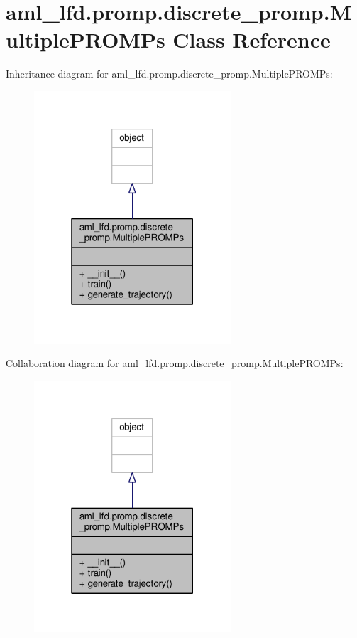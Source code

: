 \hypertarget{classaml__lfd_1_1promp_1_1discrete__promp_1_1_multiple_p_r_o_m_ps}{\section{aml\-\_\-lfd.\-promp.\-discrete\-\_\-promp.\-Multiple\-P\-R\-O\-M\-Ps Class Reference}
\label{classaml__lfd_1_1promp_1_1discrete__promp_1_1_multiple_p_r_o_m_ps}
}


Inheritance diagram for aml\-\_\-lfd.\-promp.\-discrete\-\_\-promp.\-Multiple\-P\-R\-O\-M\-Ps\-:
\nopagebreak
\begin{figure}[H]
\begin{center}
\leavevmode
\includegraphics[width=208pt]{classaml__lfd_1_1promp_1_1discrete__promp_1_1_multiple_p_r_o_m_ps__inherit__graph}
\end{center}
\end{figure}


Collaboration diagram for aml\-\_\-lfd.\-promp.\-discrete\-\_\-promp.\-Multiple\-P\-R\-O\-M\-Ps\-:
\nopagebreak
\begin{figure}[H]
\begin{center}
\leavevmode
\includegraphics[width=208pt]{classaml__lfd_1_1promp_1_1discrete__promp_1_1_multiple_p_r_o_m_ps__coll__graph}
\end{center}
\end{figure}
